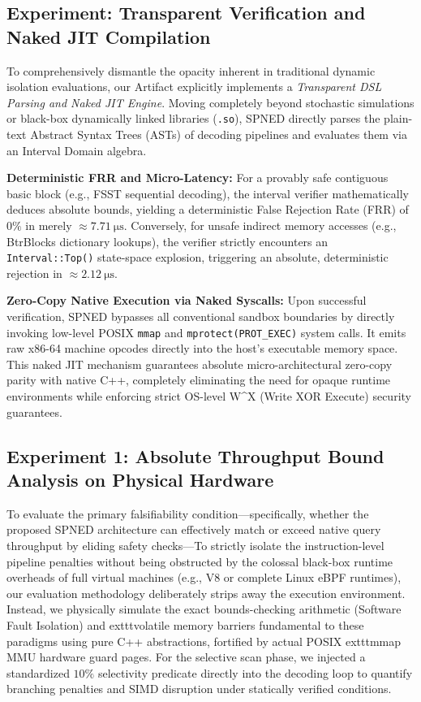 \documentclass[onecolumn]{IEEEtran}
\numberwithin{equation}{section}
\theoremstyle{definition}
\theoremstyle{remark}
\begin{document}
\subsection{Experiment: Transparent Verification and Naked JIT Compilation}

To comprehensively dismantle the opacity inherent in traditional dynamic isolation evaluations, our Artifact explicitly implements a \textit{Transparent DSL Parsing and Naked JIT Engine}. Moving completely beyond stochastic simulations or black-box dynamically linked libraries (\texttt{.so}), SPNED directly parses the plain-text Abstract Syntax Trees (ASTs) of decoding pipelines and evaluates them via an Interval Domain algebra.

\textbf{Deterministic FRR and Micro-Latency:} For a provably safe contiguous basic block (e.g., FSST sequential decoding), the interval verifier mathematically deduces absolute bounds, yielding a deterministic False Rejection Rate (FRR) of $0\%$ in merely $\approx \SI{7.71}{\micro\second}$. Conversely, for unsafe indirect memory accesses (e.g., BtrBlocks dictionary lookups), the verifier strictly encounters an \texttt{Interval::Top()} state-space explosion, triggering an absolute, deterministic rejection in $\approx \SI{2.12}{\micro\second}$.

\textbf{Zero-Copy Native Execution via Naked Syscalls:} Upon successful verification, SPNED bypasses all conventional sandbox boundaries by directly invoking low-level POSIX \texttt{mmap} and \texttt{mprotect(PROT\_EXEC)} system calls. It emits raw x86-64 machine opcodes directly into the host's executable memory space. This naked JIT mechanism guarantees absolute micro-architectural zero-copy parity with native C++, completely eliminating the need for opaque runtime environments while enforcing strict OS-level W\textasciicircum X (Write XOR Execute) security guarantees.

\subsection{Experiment 1: Absolute Throughput Bound Analysis on Physical Hardware}

To evaluate the primary falsifiability condition—specifically, whether the proposed SPNED architecture can effectively match or exceed native query throughput by eliding safety checks—To strictly isolate the instruction-level pipeline penalties without being obstructed by the colossal black-box runtime overheads of full virtual machines (e.g., V8 or complete Linux eBPF runtimes), our evaluation methodology deliberately strips away the execution environment. Instead, we physically simulate the exact bounds-checking arithmetic (Software Fault Isolation) and 	exttt{volatile} memory barriers fundamental to these paradigms using pure C++ abstractions, fortified by actual POSIX 	exttt{mmap} MMU hardware guard pages. For the selective scan phase, we injected a standardized $10\%$ selectivity predicate directly into the decoding loop to quantify branching penalties and SIMD disruption under statically verified conditions.
\end{document}
